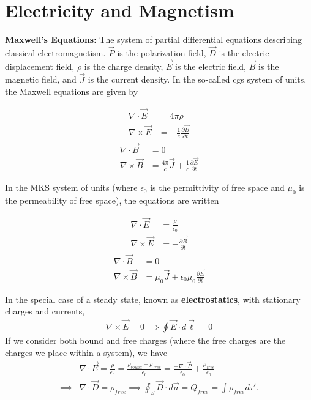 \chapter{Electricity and Magnetism}
\thispagestyle{fancy}
\textbf{Maxwell's Equations:} The system of partial differential equations describing classical electromagnetism. $\vec{P}$ is the polarization field, $\vec{D}$ is the electric displacement field, $\rho$ is the charge density, $\vec{E}$ is the electric field, $\vec{B}$ is the magnetic field, and $\vec{J}$ is the current density. In the so-called cgs system of units, the Maxwell equations are given by 
\begin{multicols}{2}
	\noindent
\begin{align}
	\nabla \cdot \vec{E} &= 4\pi\rho \\
	\nabla \times \vec{E} &= -\frac{1}{c}\frac{\partial \vec{B}}{\partial t} 
\end{align}
\begin{align}
	\nabla \cdot \vec{B} &= 0 \\
	\nabla \times \vec{B} &= \frac{4\pi}{c}\vec{J}+\frac{1}{c}\frac{\partial \vec{E}}{\partial t} 
\end{align}
\end{multicols}
In the MKS system of units (where $\epsilon_0$ is the permittivity of free space and $\mu_0$ is the permeability of free space), the equations are written 
\begin{multicols}{2}
	\noindent
	\begin{align}
		\nabla \cdot \vec{E} &= \frac{\rho}{\epsilon_0}\\
		\nabla \times \vec{E} &= -\frac{\partial \vec{B}}{\partial t} 
	\end{align}
	\begin{align}
		\nabla \cdot \vec{B} &= 0 \\
		\nabla \times \vec{B} &= \mu_0\vec{J}+\epsilon_0\mu_0\frac{\partial \vec{E}}{\partial t} 
	\end{align}
\end{multicols}
In the special case of a steady state, known as \textbf{electrostatics}, with stationary charges and currents, \begin{align}
 \nabla \times \vec{E} = 0 \implies \oint \vec{E} \cdot d\vec{\ell} = 0 
\end{align}	
If we consider both bound and free charges (where the free charges are the charges we place within a system), we have
\begin{align}
	&\nabla \cdot \vec{E} = \frac{\rho}{\epsilon_0} = \frac{\rho_{bound}+\rho_{free}}{\epsilon_0} = \frac{-\nabla \cdot \vec{P}}{\epsilon_0}+\frac{\rho_{free}}{\epsilon_0} \\ \implies &\nabla \cdot \vec{D} = \rho_{free} \implies \oint_S \vec{D} \cdot d\vec{a} = Q_{free} = \int \rho_{free} d\tau'.
\end{align}
